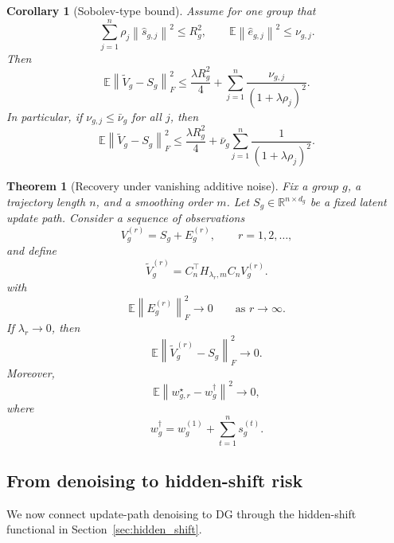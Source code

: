 \documentclass{article}
\newtheorem{theorem}{Theorem}
\newtheorem{corollary}{Corollary}
\newcommand{\RR}{\mathbb{R}}
\newcommand{\EE}{\mathbb{E}}
\newcommand{\norm}[1]{\left\lVert #1 \right\rVert}
\begin{document}
\begin{corollary}[Sobolev-type bound]
\label{cor:sobolev}
Assume for one group that
\begin{equation}
\sum_{j=1}^{n} \rho_j \norm{\widehat s_{g,j}}^2 \le R_g^2,
\qquad
\EE\norm{\widehat e_{g,j}}^2 \le \nu_{g,j}.
\label{eq:sobolev_assumption}
\end{equation}
Then
\begin{equation}
\EE \norm{\widetilde V_g - S_g}_F^2
\le
\frac{\lambda R_g^2}{4}
+
\sum_{j=1}^{n} \frac{\nu_{g,j}}{(1+\lambda \rho_j)^2}.
\label{eq:sobolev_bound}
\end{equation}
In particular, if \(\nu_{g,j}\le \bar \nu_g\) for all \(j\), then
\begin{equation}
\EE \norm{\widetilde V_g - S_g}_F^2
\le
\frac{\lambda R_g^2}{4}
+
\bar \nu_g \sum_{j=1}^{n} \frac{1}{(1+\lambda \rho_j)^2}.
\label{eq:sobolev_bound_uniform}
\end{equation}
\end{corollary}

\begin{theorem}[Recovery under vanishing additive noise]
\label{thm:consistency}
Fix a group \(g\), a trajectory length \(n\), and a smoothing order \(m\). Let \(S_g\in\RR^{n\times d_g}\) be a fixed latent update path. Consider a sequence of observations
\[
V_g^{(r)} = S_g + E_g^{(r)},
\qquad r=1,2,\ldots,
\]
and define
\[
\widetilde V_g^{(r)} = C_n^\top H_{\lambda_r,m} C_n V_g^{(r)}.
\]
with
\begin{equation}
\EE \norm{E_g^{(r)}}_F^2 \to 0
\qquad \text{as } r\to\infty.
\label{eq:noise_vanish}
\end{equation}
If \(\lambda_r \to 0\), then
\begin{equation}
\EE \norm{\widetilde V_g^{(r)} - S_g}_F^2 \to 0.
\label{eq:consistency_updates}
\end{equation}
Moreover,
\begin{equation}
\EE \norm{w_{g,r}^\star - w_g^\dagger}^2 \to 0,
\label{eq:endpoint_consistency}
\end{equation}
where
\[
w_g^\dagger = w_g^{(1)} + \sum_{t=1}^{n} s_g^{(t)}.
\]
\end{theorem}

\subsection{From denoising to hidden-shift risk}

We now connect update-path denoising to DG through the hidden-shift functional in Section~\ref{sec:hidden_shift}.
\end{document}
